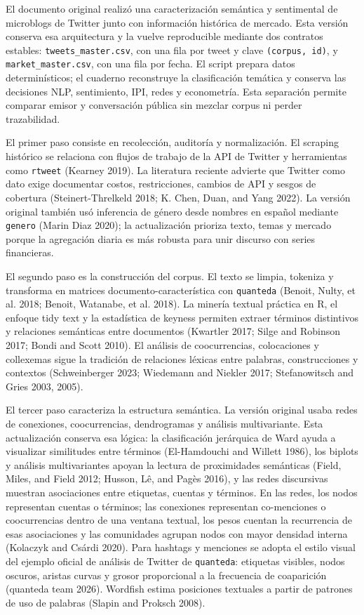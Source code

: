 \documentclass[
]{interact}
\begin{document}
El documento original realizó una caracterización semántica y
sentimental de microblogs de Twitter junto con información histórica de
mercado. Esta versión conserva esa arquitectura y la vuelve reproducible
mediante dos contratos estables: \texttt{tweets\_master.csv}, con una
fila por tweet y clave \texttt{(corpus,\ id)}, y
\texttt{market\_master.csv}, con una fila por fecha. El script prepara
datos determinísticos; el cuaderno reconstruye la clasificación temática
y conserva las decisiones NLP, sentimiento, IPI, redes y econometría.
Esta separación permite comparar emisor y conversación pública sin
mezclar corpus ni perder trazabilidad.

El primer paso consiste en recolección, auditoría y normalización. El
scraping histórico se relaciona con flujos de trabajo de la API de
Twitter y herramientas como \texttt{rtweet} (Kearney 2019). La
literatura reciente advierte que Twitter como dato exige documentar
costos, restricciones, cambios de API y sesgos de cobertura
(Steinert-Threlkeld 2018; K. Chen, Duan, and Yang 2022). La versión
original también usó inferencia de género desde nombres en español
mediante \texttt{genero} (Marin Diaz 2020); la actualización prioriza
texto, temas y mercado porque la agregación diaria es más robusta para
unir discurso con series financieras.

El segundo paso es la construcción del corpus. El texto se limpia,
tokeniza y transforma en matrices documento-característica con
\texttt{quanteda} (Benoit, Nulty, et al. 2018; Benoit, Watanabe, et al.
2018). La minería textual práctica en R, el enfoque tidy text y la
estadística de keyness permiten extraer términos distintivos y
relaciones semánticas entre documentos (Kwartler 2017; Silge and
Robinson 2017; Bondi and Scott 2010). El análisis de coocurrencias,
colocaciones y collexemas sigue la tradición de relaciones léxicas entre
palabras, construcciones y contextos (Schweinberger 2023; Wiedemann and
Niekler 2017; Stefanowitsch and Gries 2003, 2005).

El tercer paso caracteriza la estructura semántica. La versión original
usaba redes de conexiones, coocurrencias, dendrogramas y análisis
multivariante. Esta actualización conserva esa lógica: la clasificación
jerárquica de Ward ayuda a visualizar similitudes entre términos
(El-Hamdouchi and Willett 1986), los biplots y análisis multivariantes
apoyan la lectura de proximidades semánticas (Field, Miles, and Field
2012; Husson, Lê, and Pagès 2016), y las redes discursivas muestran
asociaciones entre etiquetas, cuentas y términos. En las redes, los
nodos representan cuentas o términos; las conexiones representan
co-menciones o coocurrencias dentro de una ventana textual, los pesos
cuentan la recurrencia de esas asociaciones y las comunidades agrupan
nodos con mayor densidad interna (Kolaczyk and Csárdi 2020). Para
hashtags y menciones se adopta el estilo visual del ejemplo oficial de
análisis de Twitter de \texttt{quanteda}: etiquetas visibles, nodos
oscuros, aristas curvas y grosor proporcional a la frecuencia de
coaparición (quanteda team 2026). Wordfish estima posiciones textuales a
partir de patrones de uso de palabras (Slapin and Proksch 2008).
\end{document}
